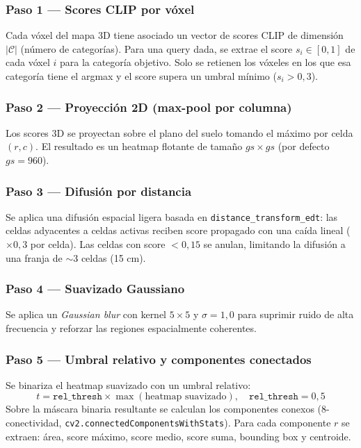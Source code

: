 \documentclass[11pt,a4paper]{article}
\begin{document}
\subsubsection*{Paso 1 — Scores CLIP por vóxel}

Cada vóxel del mapa 3D tiene asociado un vector de scores CLIP de dimensión
$|\mathcal{C}|$ (número de categorías). Para una query dada, se extrae el score
$s_i \in [0,1]$ de cada vóxel $i$ para la categoría objetivo. Solo se retienen los
vóxeles en los que esa categoría tiene el argmax y el score supera un umbral mínimo
($s_i > 0{,}3$).

\subsubsection*{Paso 2 — Proyección 2D (max-pool por columna)}

Los scores 3D se proyectan sobre el plano del suelo tomando el máximo por celda
$(r, c)$. El resultado es un heatmap flotante de tamaño $gs \times gs$
(por defecto $gs = 960$).

\subsubsection*{Paso 3 — Difusión por distancia}

Se aplica una difusión espacial ligera basada en \texttt{distance\_transform\_edt}:
las celdas adyacentes a celdas activas reciben score propagado con una caída lineal
($\times 0{,}3$ por celda). Las celdas con score $< 0{,}15$ se anulan, limitando la
difusión a una franja de $\sim$3 celdas (15 cm).

\subsubsection*{Paso 4 — Suavizado Gaussiano}

Se aplica un \textit{Gaussian blur} con kernel $5\times5$ y $\sigma=1{,}0$ para
suprimir ruido de alta frecuencia y reforzar las regiones espacialmente coherentes.

\subsubsection*{Paso 5 — Umbral relativo y componentes conectados}

Se binariza el heatmap suavizado con un umbral relativo:
\[
  t = \texttt{rel\_thresh} \times \max(\text{heatmap suavizado}), \quad
  \texttt{rel\_thresh} = 0{,}5
\]
Sobre la máscara binaria resultante se calculan los componentes conexos
(8-conectividad, \texttt{cv2.connectedComponentsWithStats}). Para cada componente
$r$ se extraen: área, score máximo, score medio, score suma, bounding box y centroide.
\end{document}

